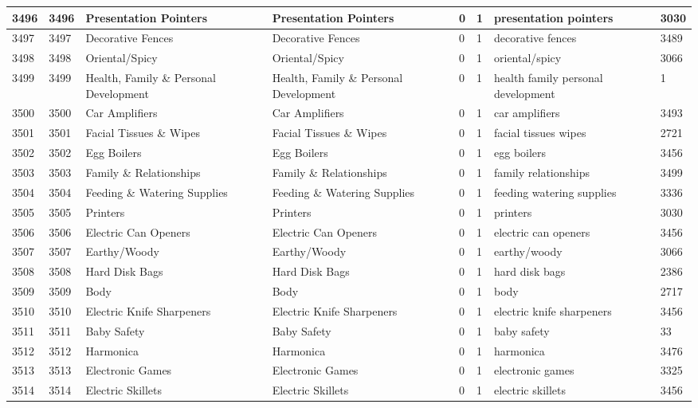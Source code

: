 \begin{longtable}{|l|l|l|l|l|l|l|l|}
3496 & 3496 & Presentation Pointers & Presentation Pointers & 0 & 1 & presentation pointers & 3030 \\ \hline 
3497 & 3497 & Decorative Fences & Decorative Fences & 0 & 1 & decorative fences & 3489 \\ \hline 
3498 & 3498 & Oriental/Spicy & Oriental/Spicy & 0 & 1 & oriental/spicy & 3066 \\ \hline 
3499 & 3499 & Health, Family \& Personal Development & Health, Family \& Personal Development & 0 & 1 & health family personal development & 1 \\ \hline 
3500 & 3500 & Car Amplifiers & Car Amplifiers & 0 & 1 & car amplifiers & 3493 \\ \hline 
3501 & 3501 & Facial Tissues \& Wipes & Facial Tissues \& Wipes & 0 & 1 & facial tissues wipes & 2721 \\ \hline 
3502 & 3502 & Egg Boilers & Egg Boilers & 0 & 1 & egg boilers & 3456 \\ \hline 
3503 & 3503 & Family \& Relationships & Family \& Relationships & 0 & 1 & family relationships & 3499 \\ \hline 
3504 & 3504 & Feeding \& Watering Supplies & Feeding \& Watering Supplies & 0 & 1 & feeding watering supplies & 3336 \\ \hline 
3505 & 3505 & Printers & Printers & 0 & 1 & printers & 3030 \\ \hline 
3506 & 3506 & Electric Can Openers & Electric Can Openers & 0 & 1 & electric can openers & 3456 \\ \hline 
3507 & 3507 & Earthy/Woody & Earthy/Woody & 0 & 1 & earthy/woody & 3066 \\ \hline 
3508 & 3508 & Hard Disk Bags & Hard Disk Bags & 0 & 1 & hard disk bags & 2386 \\ \hline 
3509 & 3509 & Body & Body & 0 & 1 & body & 2717 \\ \hline 
3510 & 3510 & Electric Knife Sharpeners & Electric Knife Sharpeners & 0 & 1 & electric knife sharpeners & 3456 \\ \hline 
3511 & 3511 & Baby Safety & Baby Safety & 0 & 1 & baby safety & 33 \\ \hline 
3512 & 3512 & Harmonica & Harmonica & 0 & 1 & harmonica & 3476 \\ \hline 
3513 & 3513 & Electronic Games & Electronic Games & 0 & 1 & electronic games & 3325 \\ \hline 
3514 & 3514 & Electric Skillets & Electric Skillets & 0 & 1 & electric skillets & 3456 \\ \hline 

\end{longtable}
